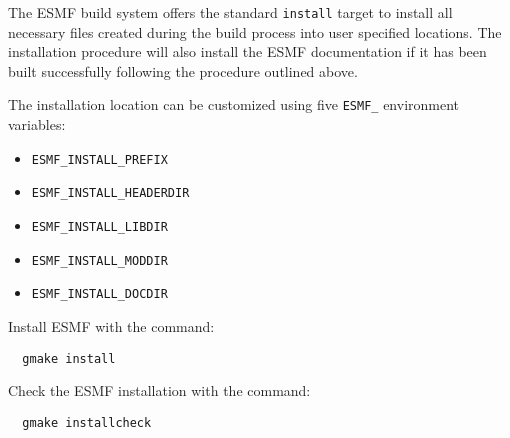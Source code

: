 The ESMF build system offers the standard {\tt install} target to install all
necessary files created during the build process into user specified locations.
The installation procedure will also install the ESMF documentation if it has
been built successfully following the procedure outlined above.

The installation location can be customized using five {\tt ESMF\_} environment
variables:
\begin{itemize}
\item {\tt ESMF\_INSTALL\_PREFIX}
\item {\tt ESMF\_INSTALL\_HEADERDIR}
\item {\tt ESMF\_INSTALL\_LIBDIR}
\item {\tt ESMF\_INSTALL\_MODDIR}
\item {\tt ESMF\_INSTALL\_DOCDIR}
\end{itemize}

Install ESMF with the command:
\begin{verbatim}
  gmake install
\end{verbatim}

Check the ESMF installation with the command:
\begin{verbatim}
  gmake installcheck
\end{verbatim}
